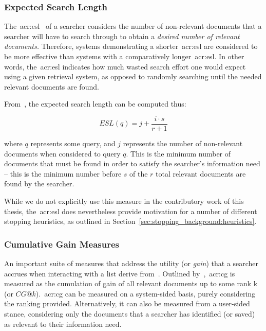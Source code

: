 \subsubsection{Expected Search Length}\label{sec:ir_background:evaluation:system:esl}
The~\gls{acr:esl}~\citep{cooper1968expected_search_length} of a searcher considers the number of non-relevant documents that a searcher will have to search through to obtain a \emph{desired number of relevant documents.} Therefore, systems demonstrating a shorter~\gls{acr:esl} are considered to be more effective than systems with a comparatively longer~\gls{acr:esl}. In other words, the~\gls{acr:esl} indicates how much wasted search effort one would expect using a given retrieval system, as opposed to randomly searching until the needed relevant documents are found.

From~\cite{cooper1968expected_search_length}, the expected search length can be computed thus:

\begin{equation*}
ESL(q) = j + \frac{i \cdot s}{r + 1}
\end{equation*}

\noindent
where $q$ represents some query, and $j$ represents the number of non-relevant documents when considered to query $q$. This is the minimum number of documents that must be found in order to satisfy the searcher's information need -- this is the minimum number before $s$ of the $r$ total relevant documents are found by the searcher.

While we do not explicitly use this measure in the contributory work of this thesis, the~\gls{acr:esl} does nevertheless provide motivation for a number of different stopping heuristics, as outlined in Section~\ref{sec:stopping_background:heuristics}.

\subsubsection{Cumulative Gain Measures}\label{sec:ir_background:evaluation:system:cg}
An important suite of measures that address the utility (or \emph{gain}) that a searcher accrues when interacting with a list derive from~. Outlined by~\cite{jarvelin2000cg, jarvelin2002cg},~\gls{acr:cg} is measured as the cumulation of gain of all relevant documents up to some rank k (or $CG@k$).~\gls{acr:cg} can be measured on a system-sided basis, purely considering the ranking provided. Alternatively, it can also be measured from a user-sided stance, considering only the documents that a searcher has identified (or saved) as relevant to their information need.

